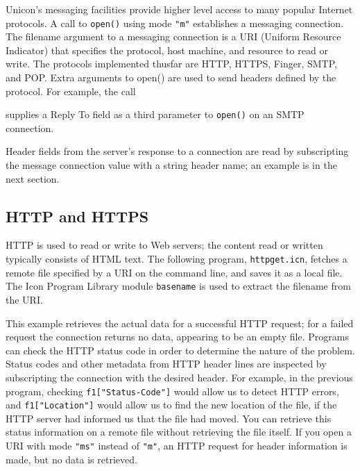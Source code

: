 Unicon's messaging facilities provide
higher level access to many popular Internet protocols. A call to
\texttt{open()} using mode \texttt{"m"}
establishes a messaging connection. The filename argument to a
messaging connection is a URI (Uniform Resource Indicator) that
specifies the protocol, host machine, and resource to read or write.
The protocols implemented thusfar are HTTP, HTTPS, Finger, SMTP, and POP.
Extra arguments to open() are used to send headers defined by the
protocol. For example, the call


\noindent
supplies a Reply To field as a third parameter to \texttt{open()} on an
SMTP connection.

Header fields from the server's response to a
connection are read by subscripting the message connection value
with a string header name; an example is in the next section.

\subsection*{HTTP and HTTPS}

HTTP is used to read or write to Web servers; the content
read or written typically consists of HTML text. The
following program, \texttt{httpget.icn}, fetches a remote file
specified by a URI on the command line, and saves it as a local file.
The Icon Program Library module \texttt{basename} is used to extract
the filename from the URI.


This example retrieves the actual data for a successful HTTP request;
for a failed request the connection returns no data, appearing to be an
empty file. Programs can check the HTTP status code in order to
determine the nature of the problem. Status codes and other metadata
from HTTP header lines are inspected by subscripting the connection
with the desired header. For example, in the previous program, checking
\texttt{f1["Status-Code"]} would allow us
to detect HTTP errors, and
\texttt{f1["Location"]} would allow us to
find the new location of the file, if the HTTP server had informed us
that the file had moved. You can retrieve this status information on a
remote file without retrieving the file itself. If you open a URI with
mode \texttt{"ms"} instead of
\texttt{"m"}, an HTTP request for header
information is made, but no data is retrieved.

